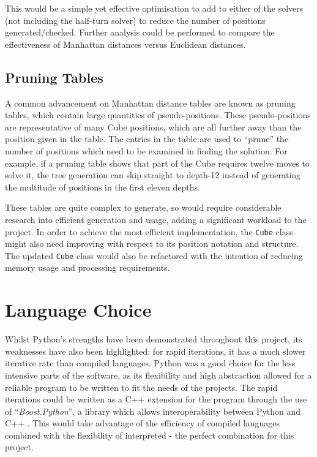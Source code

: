 \documentclass{report}
\newcommand{\tit}[1]{\textit{#1}}
\newcommand{\propernoun}[1]{\enquote{\tit{#1}}}
\newcommand{\depth}[1]{depth-#1}
\begin{document}
	This would be a simple yet effective optimisation to add to either of the solvers (not including the half-turn solver) to reduce the number of positions generated/checked. Further analysis could be performed to compare the effectiveness of Manhattan distances versus Euclidean distances.

	\subsection{Pruning Tables}
        
	A common advancement on Manhattan distance tables are known as pruning tables, which contain large quantities of pseudo-positions. These pseudo-positions are representative of many Cube positions, which are all further away than the position given in the table. The entries in the table are used to \enquote{prune} the number of positions which need to be examined in finding the solution. For example, if a pruning table shows that part of the Cube requires twelve moves to solve it, the tree generation can skip straight to \depth{12} instead of generating the multitude of positions in the first eleven depths.
	
	These tables are quite complex to generate, so would require considerable research into efficient generation and usage, adding a significant workload to the project. In order to achieve the most efficient implementation, the \lstinline|Cube| class might also need improving with respect to its position notation and structure. The updated \lstinline|Cube| class would also be refactored with the intention of reducing memory usage and processing requirements.
	
	\section{Language Choice}
	
	Whilst Python's strengths have been demonstrated throughout this project, its weaknesses have also been highlighted: for rapid iterations, it has a much slower iterative rate than compiled languages. Python was a good choice for the less intensive parts of the software, as its flexibility and high abstraction allowed for a reliable program to be written to fit the needs of the projects. The rapid iterations could be written as a C++ extension for the program through the use of \propernoun{Boost.Python}, a library which allows interoperability between Python and C++ \cite{Abrahams2015}. This would take advantage of the efficiency of compiled languages combined with the flexibility of interpreted - the perfect combination for this project.
	
\end{document}
